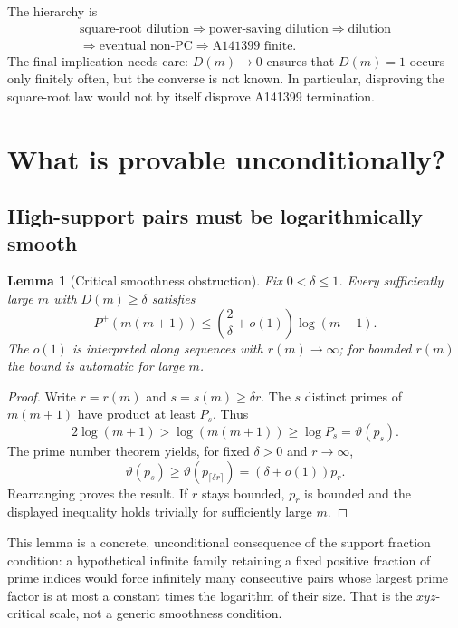 \documentclass[11pt,letterpaper]{article}
\newtheorem{lemma}[conjecture]{Lemma}
\theoremstyle{remark}
\newcommand{\GPF}{P^{+}}
\begin{document}
The hierarchy is
\[
\begin{gathered}
\text{square-root dilution}\Longrightarrow\text{power-saving dilution}
\Longrightarrow\text{dilution}\\
\Longrightarrow\text{eventual non-PC}
\Longrightarrow\text{A141399 finite}.
\end{gathered}
\]
The final implication needs care: $D(m)\to0$ ensures that $D(m)=1$
occurs only finitely often, but the converse is not known. In
particular, disproving the square-root law would not by itself disprove
A141399 termination.

\section{What is provable unconditionally?}
\subsection{High-support pairs must be logarithmically smooth}
\begin{lemma}[Critical smoothness obstruction]\label{lem:logsmooth}
Fix $0<\delta\le1$. Every sufficiently large $m$ with $D(m)\ge\delta$
satisfies
\[
\boxed{\GPF(m(m+1))\le\left(\frac{2}{\delta}+o(1)\right)\log(m+1).}
\]
The $o(1)$ is interpreted along sequences with $r(m)\to\infty$;
for bounded $r(m)$ the bound is automatic for large $m$.
\end{lemma}
\begin{proof}
Write $r=r(m)$ and $s=s(m)\ge\delta r$. The $s$ distinct primes
of $m(m+1)$ have product at least $P_s$. Thus
\[
2\log(m+1)>\log(m(m+1))\ge \log P_s=\vartheta(p_s).
\]
The prime number theorem yields, for fixed $\delta>0$ and $r\to\infty$,
\[
\vartheta(p_s)\ge\vartheta(p_{\lceil\delta r\rceil})
 =(\delta+o(1))p_r.
\]
Rearranging proves the result. If $r$ stays bounded, $p_r$ is bounded
and the displayed inequality holds trivially for sufficiently large $m$.
\end{proof}

This lemma is a concrete, unconditional consequence of the support
fraction condition: a hypothetical infinite family retaining a fixed
positive fraction of prime indices would force infinitely many
consecutive pairs whose largest prime factor is at most a constant
times the logarithm of their size. That is the $xyz$-critical scale,
not a generic smoothness condition.
\end{document}
